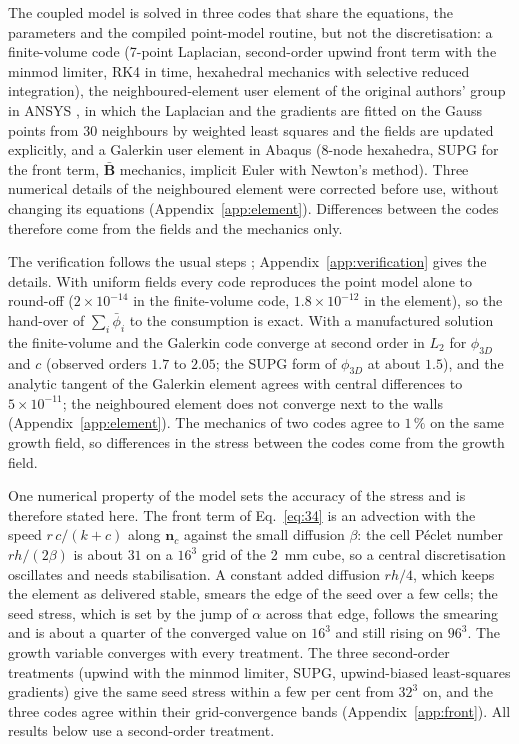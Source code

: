 \documentclass[11pt,a4paper]{article}
\newcommand{\phiD}{\phi_{3D}}
\newcommand{\lv}{\textstyle\sum_i\bar\phi_i}
\newcommand{\nc}{\mathbf n_c}
\begin{document}
The coupled model is solved in three codes that share the equations, the parameters and the compiled point-model routine, but not the discretisation: a finite-volume code (7-point Laplacian, second-order upwind front term with the minmod limiter, RK4 in time, hexahedral mechanics with selective reduced integration), the neighboured-element user element of the original authors' group in ANSYS \citep{Blaszczyk2022TaylorWLS,Rudolf2025NEM}, in which the Laplacian and the gradients are fitted on the Gauss points from 30 neighbours by weighted least squares and the fields are updated explicitly, and a Galerkin user element in Abaqus (8-node hexahedra, SUPG \citep{BrooksHughes1982SUPG} for the front term, $\bar{\mathbf B}$ mechanics, implicit Euler with Newton's method). Three numerical details of the neighboured element were corrected before use, without changing its equations (Appendix~\ref{app:element}). Differences between the codes therefore come from the fields and the mechanics only.

The verification follows the usual steps \citep{Roache2002MMS,Celik2008GCI}; Appendix~\ref{app:verification} gives the details. With uniform fields every code reproduces the point model alone to round-off ($2\times10^{-14}$ in the finite-volume code, $1.8\times10^{-12}$ in the element), so the hand-over of $\lv$ to the consumption is exact. With a manufactured solution the finite-volume and the Galerkin code converge at second order in $L_2$ for $\phiD$ and $c$ (observed orders $1.7$ to $2.05$; the SUPG form of $\phiD$ at about $1.5$), and the analytic tangent of the Galerkin element agrees with central differences to $5\times10^{-11}$; the neighboured element does not converge next to the walls (Appendix~\ref{app:element}). The mechanics of two codes agree to $1\,\%$ on the same growth field, so differences in the stress between the codes come from the growth field.

One numerical property of the model sets the accuracy of the stress and is therefore stated here. The front term of Eq.~\eqref{eq:34} is an advection with the speed $r\,c/(k+c)$ along $\nc$ against the small diffusion $\beta$: the cell P\'eclet number $rh/(2\beta)$ is about $31$ on a $16^3$ grid of the 2~mm cube, so a central discretisation oscillates and needs stabilisation. A constant added diffusion $rh/4$, which keeps the element as delivered stable, smears the edge of the seed over a few cells; the seed stress, which is set by the jump of $\alpha$ across that edge, follows the smearing and is about a quarter of the converged value on $16^3$ and still rising on $96^3$. The growth variable converges with every treatment. The three second-order treatments (upwind with the minmod limiter, SUPG, upwind-biased least-squares gradients) give the same seed stress within a few per cent from $32^3$ on, and the three codes agree within their grid-convergence bands (Appendix~\ref{app:front}). All results below use a second-order treatment.
\end{document}
